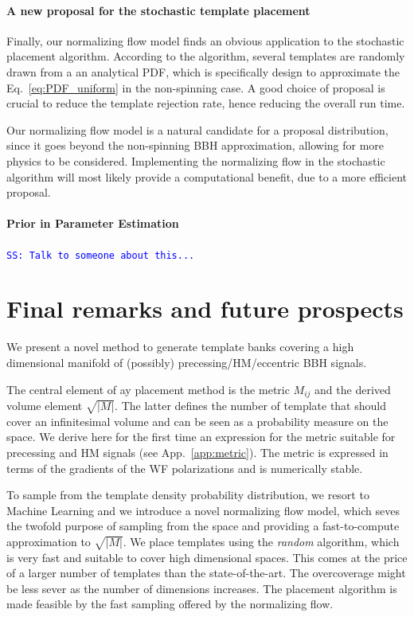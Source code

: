\documentclass[twocolumn,showpacs,preprintnumbers,nofootinbib,prd,
superscriptaddress,10pt]{revtex4-2}
\newcommand{\stefano}[1]{{\textcolor{blue}{\texttt{SS: #1}} }}
\begin{document}
\paragraph{A new proposal for the stochastic template placement}

Finally, our normalizing flow model finds an obvious application to the stochastic placement algorithm. According to the algorithm, several templates are randomly drawn from a an analytical PDF, which is specifically design to approximate the Eq.~\eqref{eq:PDF_uniform} in the non-spinning case.
A good choice of proposal is crucial to reduce the template rejection rate, hence reducing the overall run time.

Our normalizing flow model is a natural candidate for a proposal distribution, since it goes beyond the non-spinning BBH approximation, allowing for more physics to be considered. Implementing the normalizing flow in the stochastic algorithm will most likely provide a computational benefit, due to a more efficient proposal.

\paragraph{Prior in Parameter Estimation}
\stefano{Talk to someone about this...}

\section{Final remarks and future prospects} \label{sec:conclusion}

We present a novel method to generate template banks covering a high dimensional manifold of (possibly) precessing/HM/eccentric BBH signals.

The central element of ay placement method is the metric $M_{ij}$ and the derived volume element $\sqrt{|M|}$. The latter defines the number of template that should cover an infinitesimal volume and can be seen as a probability measure on the space.
We derive here for the first time an expression for the metric suitable for precessing and HM signals (see App.~\ref{app:metric}). The metric is expressed in terms of the gradients of the WF polarizations and is numerically stable.

To sample from the template density probability distribution, we resort to Machine Learning and we introduce a novel normalizing flow model, which seves the twofold purpose of sampling from the space and providing a fast-to-compute approximation to $\sqrt{|M|}$.
We place templates using the {\it random} algorithm, which is very fast and suitable to cover high dimensional spaces. This comes at the price of a larger number of templates than the state-of-the-art. The overcoverage might be less sever as the number of dimensions increases.
The placement algorithm is made feasible by the fast sampling offered by the normalizing flow.
\end{document}
